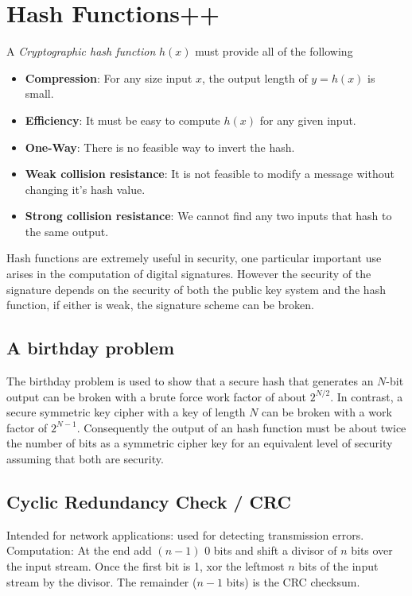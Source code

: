 \documentclass[a4paper]{article}
\begin{document}
\section{Hash Functions++}
A \textit{Cryptographic hash function} $h(x)$ must provide all of the following
\begin{itemize}
    \item \textbf{Compression}: For any size input $x$, the output length of $y = h(x)$ is small.
    \item \textbf{Efficiency}: It must be easy to compute $h(x)$ for any given input.
    \item \textbf{One-Way}: There is no feasible way to invert the hash.
    \item \textbf{Weak collision resistance}: It is not feasible to modify a message without changing it's hash value.
    \item \textbf{Strong collision resistance}: We cannot find any two inputs that hash to the same output.
\end{itemize}
Hash functions are extremely useful in security, one particular important use arises in the computation of digital signatures. However the security of the signature depends on the security of both the public key system and the hash function, if either is weak, the signature scheme can be broken.

\subsection{A birthday problem}
The birthday problem is used to show that a secure hash that generates an $N$-bit output can be broken with a brute force work factor of about $2^{N/2}$. In contrast, a secure symmetric key cipher with a key of length $N$ can be broken with a work factor of $2^{N-1}$. Consequently the output of an hash function must be about twice the number of bits as a symmetric cipher key for an equivalent level of security assuming that both are security.

\subsection{Cyclic Redundancy Check / CRC}
Intended for network applications: used for detecting transmission errors.\\
Computation: At the end add $(n-1)$ 0 bits and shift a divisor of $n$ bits over the input stream. Once the first bit is 1, xor the leftmost $n$ bits of the input stream by the divisor. The remainder ($n-1$ bits) is the CRC checksum.
\end{document}
